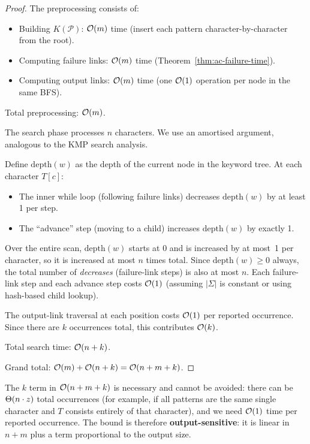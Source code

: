 \begin{formaldetails}
\begin{proof}
  The preprocessing consists of:
  \begin{itemize}[nosep]
    \item Building $K(\mathcal{P})$: $\mathcal{O}\!\left(m\right)$ time (insert each pattern
          character-by-character from the root).
    \item Computing failure links: $\mathcal{O}\!\left(m\right)$ time
          (Theorem~\ref{thm:ac-failure-time}).
    \item Computing output links: $\mathcal{O}\!\left(m\right)$ time (one $\mathcal{O}\!\left(1\right)$
          operation per node in the same BFS).
  \end{itemize}
  Total preprocessing: $\mathcal{O}\!\left(m\right)$.

  The search phase processes $n$ characters.
  We use an amortised argument, analogous to the KMP search analysis.

  Define $\mathrm{depth}(w)$ as the depth of the current node in the
  keyword tree.
  At each character $T[c]$:
  \begin{itemize}[nosep]
    \item The inner while loop (following failure links) decreases
          $\mathrm{depth}(w)$ by at least 1 per step.
    \item The ``advance'' step (moving to a child) increases
          $\mathrm{depth}(w)$ by exactly 1.
  \end{itemize}

  Over the entire scan, $\mathrm{depth}(w)$ starts at 0 and is
  increased by at most~1 per character, so it is increased at most $n$
  times total.
  Since $\mathrm{depth}(w) \ge 0$ always, the total number of
  \emph{decreases} (failure-link steps) is also at most $n$.
  Each failure-link step and each advance step costs $\mathcal{O}\!\left(1\right)$
  (assuming $|\Sigma|$ is constant or using hash-based child lookup).

  The output-link traversal at each position costs $\mathcal{O}\!\left(1\right)$ per
  reported occurrence.
  Since there are $k$ occurrences total, this contributes $\mathcal{O}\!\left(k\right)$.

  Total search time: $\mathcal{O}\!\left(n + k\right)$.

  Grand total: $\mathcal{O}\!\left(m\right) + \mathcal{O}\!\left(n + k\right) = \mathcal{O}\!\left(n + m + k\right)$.
\end{proof}
\end{formaldetails}

\begin{remark}
  The $k$ term in $\mathcal{O}\!\left(n + m + k\right)$ is necessary and cannot be avoided:
  there can be $\Theta\!\left(n \cdot z\right)$ total occurrences (for example, if all
  patterns are the same single character and $T$ consists entirely of
  that character), and we need $\mathcal{O}\!\left(1\right)$ time per reported occurrence.
  The bound is therefore \textbf{output-sensitive}: it is linear in
  $n + m$ plus a term proportional to the output size.
\end{remark}

